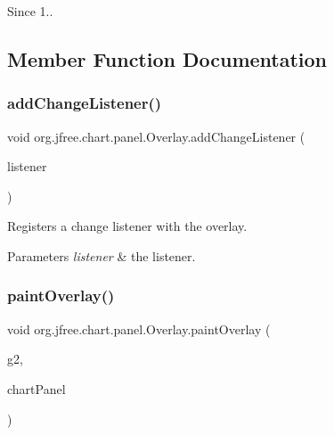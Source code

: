 \begin{DoxySince}{Since}
1.. 
\end{DoxySince}


\subsection{Member Function Documentation}
\mbox{\label{interfaceorg_1_1jfree_1_1chart_1_1panel_1_1_overlay_aa1d3ce6adb108ff2b780dcb40d09e6ee}} 
\subsubsection{\texorpdfstring{add\+Change\+Listener()}{addChangeListener()}}
{\footnotesize\ttfamily void org.\+jfree.\+chart.\+panel.\+Overlay.\+add\+Change\+Listener (\begin{DoxyParamCaption}\item[{\mbox{\hyperlink{interfaceorg_1_1jfree_1_1chart_1_1event_1_1_overlay_change_listener}{Overlay\+Change\+Listener}}}]{listener }\end{DoxyParamCaption})}

Registers a change listener with the overlay.


\begin{DoxyParams}{Parameters}
{\em listener} & the listener. \\
\hline
\end{DoxyParams}
\mbox{\label{interfaceorg_1_1jfree_1_1chart_1_1panel_1_1_overlay_aef899ccf9040a90153f231db8796069f}} 
\subsubsection{\texorpdfstring{paint\+Overlay()}{paintOverlay()}}
{\footnotesize\ttfamily void org.\+jfree.\+chart.\+panel.\+Overlay.\+paint\+Overlay (\begin{DoxyParamCaption}\item[{Graphics2D}]{g2,  }\item[{\mbox{\hyperlink{classorg_1_1jfree_1_1chart_1_1_chart_panel}{Chart\+Panel}}}]{chart\+Panel }\end{DoxyParamCaption})}


